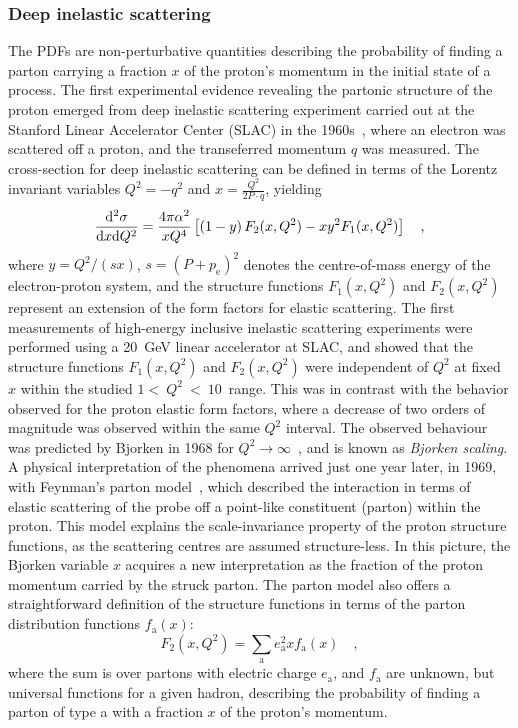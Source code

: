 \subsubsection{Deep inelastic scattering}
The PDFs are non-perturbative quantities describing the probability of finding a parton carrying a fraction $x$ of the proton's momentum in the initial state of a process. The first experimental evidence revealing the partonic structure of the proton emerged from deep inelastic scattering experiment carried out at the Stanford Linear Accelerator Center (SLAC) in the 1960s~\cite{Friedman:1972sy}, where an electron was scattered off a proton, and the transeferred momentum $q$ was measured. The cross-section for deep inelastic scattering can be defined in terms of the Lorentz invariant variables $Q^2 = -q^2$ and $x = \frac{Q^2}{2P\cdot q}$, yielding
\begin{equation*}
    \frac{\mathrm{d}^2\sigma}{\mathrm{d} x \mathrm{d} Q^2} = \frac{4\pi\alpha^2}{xQ^4} \left[ \left(1-y\right)F_2(x,Q^2) - xy^2F_1(x,Q^2) \right]\quad ,
\end{equation*}
where $y=Q^2/(sx)$, $s = (P+p_\mathrm{e})^2$ denotes the centre-of-mass energy of the electron-proton system, and the structure functions $F_1(x,Q^2)$ and $F_2(x,Q^2)$ represent an extension of the form factors for elastic scattering.
The first measurements of high-energy inclusive inelastic scattering experiments were performed using a 20~GeV linear accelerator at SLAC, and showed that the structure functions $F_1(x,Q^2)$ and $F_2(x,Q^2)$ were independent of $Q^2$ at fixed $x$ within the studied $1<~Q^2~<~10$~\gevcc range. This was in contrast with the behavior observed for the proton elastic form factors, where a decrease of two orders of magnitude was observed within the same $Q^2$ interval. The observed behaviour was predicted by Bjorken in 1968 for $Q^2 \rightarrow \infty$~\cite{Bjorken:1968dy}, and is known as \emph{Bjorken scaling}. A physical interpretation of the phenomena arrived just one year later, in 1969, with Feynman's parton model~\cite{Feynman:1969ej}, which described the interaction in terms of elastic scattering of the probe off a point-like constituent (parton) within the proton. This model explains the scale-invariance property of the proton structure functions, as the scattering centres are assumed structure-less. In this picture, the Bjorken variable $x$ acquires a new interpretation as the fraction of the proton momentum carried by the struck parton. The parton model also offers a straightforward definition of the structure functions in terms of the parton distribution functions $f_\mathrm{a}(x)$:
\begin{equation*}
    F_2(x,Q^2) = \sum_\mathrm{a} e_\mathrm{a}^2 x f_\mathrm{a}(x)\quad ,
\end{equation*}
where the sum is over partons with electric charge $e_\mathrm{a}$, and $f_\mathrm{a}$ are unknown, but universal functions for a given hadron, describing the probability of finding a parton of type a with a fraction $x$ of the proton's momentum. 

